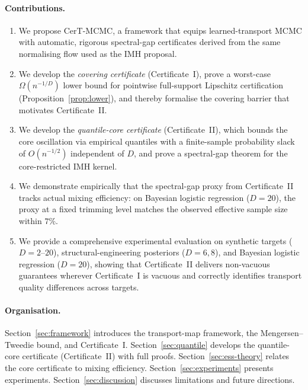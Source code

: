 \documentclass[12pt]{article}
\begin{document}
\paragraph{Contributions.}
\begin{enumerate}[nosep, label=(\roman*)]
\item We propose CerT-MCMC, a framework that equips learned-transport MCMC with automatic, rigorous spectral-gap certificates derived from the same normalising flow used as the IMH proposal.
\item We develop the \emph{covering certificate} (Certificate~I), prove a worst-case $\Omega(n^{-1/D})$ lower bound for pointwise full-support Lipschitz certification (Proposition~\ref{prop:lower}), and thereby formalise the covering barrier that motivates Certificate~II.
\item We develop the \emph{quantile-core certificate} (Certificate~II), which bounds the core oscillation via empirical quantiles with a finite-sample probability slack of $O(n^{-1/2})$ independent of $D$, and prove a spectral-gap theorem for the core-restricted IMH kernel.
\item We demonstrate empirically that the spectral-gap proxy from Certificate~II tracks actual mixing efficiency: on Bayesian logistic regression ($D = 20$), the proxy at a fixed trimming level matches the observed effective sample size within $7\%$.
\item We provide a comprehensive experimental evaluation on synthetic targets ($D = 2$--$20$), structural-engineering posteriors ($D = 6, 8$), and Bayesian logistic regression ($D = 20$), showing that Certificate~II delivers non-vacuous guarantees wherever Certificate~I is vacuous and correctly identifies transport quality differences across targets.
\end{enumerate}

\paragraph{Organisation.}
Section~\ref{sec:framework} introduces the transport-map framework, the Mengersen--Tweedie bound, and Certificate~I.
Section~\ref{sec:quantile} develops the quantile-core certificate (Certificate~II) with full proofs.
Section~\ref{sec:ess-theory} relates the core certificate to mixing efficiency.
Section~\ref{sec:experiments} presents experiments.
Section~\ref{sec:discussion} discusses limitations and future directions.


\end{document}
